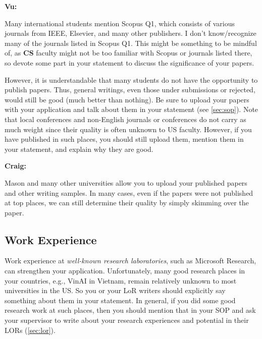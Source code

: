\documentclass[oneside,11pt,dvipsnames]{book}
\newenvironment{commentbox}[1][]{
  \small
  \begin{mybox}
    {\small \textbf{#1}}
  }{
  \end{mybox}
}
\begin{document}
\begin{commentbox}[Vu:]
  Many international students mention Scopus Q1, which consists of various journals from IEEE, Elsevier, and many other publishers.  I don't know/recognize many of the journals listed in Scopus Q1. This might be something to be mindful of, as \textbf{CS} faculty might not be too familiar with Scopus or journals listed there, so devote some part in your statement to discuss the significance of your papers.
\end{commentbox}

However, it is understandable that many students do not have the opportunity to publish papers. Thus, general writings, even those under submissions or rejected, would still be good (much better than nothing).  Be sure to upload your papers with your application and talk about them in your statement (see \autoref{sec:sop}).  Note that local conferences and non-English journals or conferences do
not carry as much weight since their quality is often unknown to US faculty. However, if you have published in such places, you should still upload them, mention them in your statement, and explain why they are good.




\begin{commentbox}[Craig:]
  Mason and many other universities allow you to upload your published papers and other writing samples. In many cases, even if the papers were not published at top places, we can still determine their quality by simply skimming over the paper.
\end{commentbox}

\subsection{Work Experience} Work experience at \emph{well-known research laboratories}, such as Microsoft Research, can strengthen your
application.  Unfortunately, many good research places in your countries, e.g., VinAI in Vietnam, remain relatively unknown to most universities in the US. So you or your LoR writers should explicitly say something about them in your statement.  In general, if you did some good research work at such places, then you should mention that in your SOP and ask your supervisor to write about your research experiences and potential in their LORs (\autoref{sec:lor}).
\end{document}
